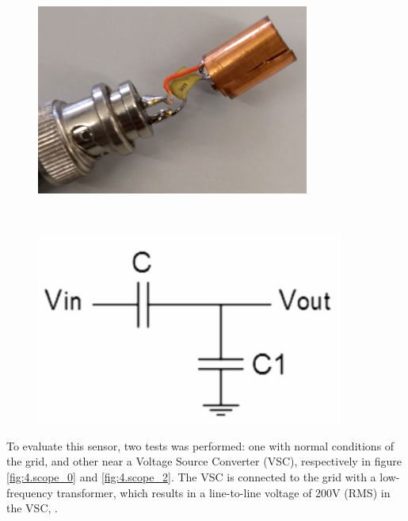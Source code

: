 	\begin{figure}[h!]
		\centering
		\begin{minipage}{.45\textwidth}
			\centering
			\includegraphics[width=0.8\textwidth,keepaspectratio]{figures/4.Method/voltage_sensor}
			\label{fig:4.voltage_sensor}
		\end{minipage}%
		\begin{minipage}{.03\textwidth}  ~\end{minipage}	
		\begin{minipage}{.45\textwidth}
			\centering
			\includegraphics[width=0.9\textwidth,keepaspectratio]{figures/4.Method/voltage_sensor_eq}
			\label{fig:4.voltage_sensor_eq}
		\end{minipage}
	\end{figure}

	
	To evaluate this sensor, two tests was performed: one with normal conditions of the grid, and other near a Voltage Source Converter (VSC), respectively in figure \ref{fig:4.scope_0} and \ref{fig:4.scope_2}. 
	The VSC is connected to the grid with a low-frequency transformer, which results in a line-to-line voltage of 200V (RMS) in the VSC, \cite{martins2016}.
	
